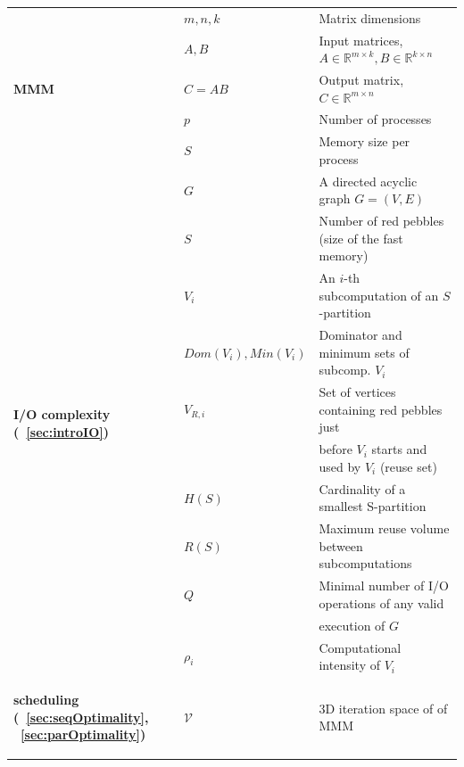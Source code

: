\documentclass[sigplan,review,anonymous]{acmart}\settopmatter{printfolios=true,printccs=false,printacmref=false}
\begin{document}
\begin{table}[h!]
	\centering
	\scriptsize
	\sf
	\begin{tabular}{@{}l|ll@{}}
		\toprule
		\multirow{5}{*}{\begin{turn}{90}\textbf{MMM}\end{turn}}
		& $m, n, k$& Matrix dimensions \\
		& $A, B$& Input matrices, $A \in \mathbb{R}^{m \times k}, B \in 
		\mathbb{R}^{k \times n}$ \\
		& $C = AB$& Output matrix, $C \in \mathbb{R}^{m \times n}$ \\
		& $p$& Number of processes \\
		& $S$& Memory size per process \\
		\midrule
		\multirow{11}{*}{\begin{turn}{90}\textbf{I/O complexity 
		(~\cref{sec:introIO})}\end{turn}}
		& $G$&A directed acyclic graph $G=(V,E)$\\
		& $S$ & Number of red pebbles (size of the fast memory)\\
		& $V_i$ & An $i$-th subcomputation of an $S$-partition \\
		& $Dom(V_i), Min(V_i)$ & Dominator and minimum sets of subcomp. 
		$V_i$\\
		& $V_{R,i}$ & Set of vertices containing red pebbles just\\
		& &  before $V_i$ starts and used by $V_i$ (reuse set) \\
		& $H(S)$ & Cardinality of a smallest S-partition \\
		& $R(S)$ & Maximum reuse volume between subcomputations \\
		& $Q$ & Minimal number of I/O operations of any valid \\ 
		& & execution of $G$ \\
				& $\rho_i$ & Computational 
		intensity of $V_i$\\
		\midrule
		\multirow{8}{*}{\begin{turn}{90}
				\textbf{scheduling (~\cref{sec:seqOptimality}, 
				~\cref{sec:parOptimality})}
			\end{turn}} 
		& $\mathcal{V}$ & 3D iteration space of of MMM~\cite{tiling}\\         

\end{tabular}
\end{table}
\end{document}
